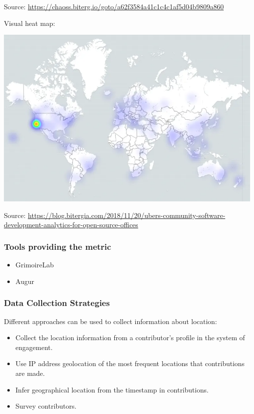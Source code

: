Source:
\url{https://chaoss.biterg.io/goto/a62f3584a41c1c4c1af5d04b9809a860}

Visual heat map:

\includegraphics{images/contributor-location_heatmap.png}

Source:
\url{https://blog.bitergia.com/2018/11/20/ubers-community-software-development-analytics-for-open-source-offices}

\hypertarget{tools-providing-the-metric}{%
\subsubsection{Tools providing the
metric}\label{tools-providing-the-metric}}

\begin{itemize}
\tightlist
\item
  GrimoireLab
\item
  Augur
\end{itemize}

\hypertarget{data-collection-strategies}{%
\subsubsection{Data Collection
Strategies}\label{data-collection-strategies}}

Different approaches can be used to collect information about location:

\begin{itemize}
\tightlist
\item
  Collect the location information from a contributor's profile in the
  system of engagement.
\item
  Use IP address geolocation of the most frequent locations that
  contributions are made.
\item
  Infer geographical location from the timestamp in contributions.
\item
  Survey contributors.
\end{itemize}

